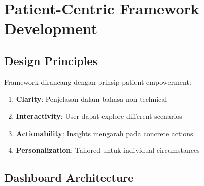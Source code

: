 \section{Patient-Centric Framework Development}

\subsection{Design Principles}
Framework dirancang dengan prinsip patient empowerment:
\begin{enumerate}
    \item \textbf{Clarity}: Penjelasan dalam bahasa non-technical
    \item \textbf{Interactivity}: User dapat explore different scenarios
    \item \textbf{Actionability}: Insights mengarah pada concrete actions
    \item \textbf{Personalization}: Tailored untuk individual circumstances
\end{enumerate}

\subsection{Dashboard Architecture}

